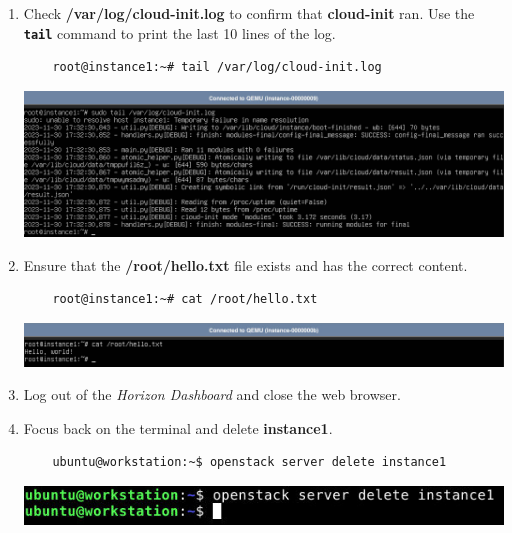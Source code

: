 \documentclass[letterpaper, 12pt]{article}
\begin{document}
\begin{enumerate}
    \item Check \textbf{/var/log/cloud-init.log} to confirm that \textbf{cloud-init} ran. Use the \textbf{\texttt{tail}}
    command to print the last 10 lines of the log.
    \begin{lstlisting}
    root@instance1:~# tail /var/log/cloud-init.log
    \end{lstlisting}

    \begin{center}
        \includegraphics[width=\linewidth]{images/part1/step30.png}
    \end{center}

    \item Ensure that the \textbf{/root/hello.txt} file exists and has the correct content.
    \begin{lstlisting}
    root@instance1:~# cat /root/hello.txt
    \end{lstlisting}

    \begin{center}
        \includegraphics[width=\linewidth]{images/part1/step31.png}
    \end{center}

    \item Log out of the \textit{Horizon Dashboard} and close the web browser.

    \item Focus back on the terminal and delete \textbf{instance1}.
    \begin{lstlisting}
    ubuntu@workstation:~$ openstack server delete instance1
    \end{lstlisting}

    \begin{center}
        \includegraphics[width=\linewidth]{images/part1/step33.png}
    \end{center}


\end{enumerate}
\end{document}
